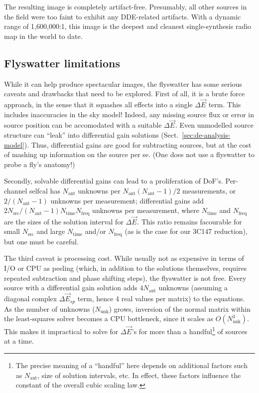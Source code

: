 \documentclass[]{aa}
\newcommand{\jones}[2]{\vec {#1}_{#2}}
\begin{document}
The resulting image is completely artifact-free. Presumably, all other sources in the field were too faint to exhibit any DDE-related artifacts. With a dynamic range of 1,600,000:1, this image is the deepest and cleanest single-synthesis radio map in the world to date. 

\subsection{Flyswatter limitations\label{sec:dE-limitations}}

While it can help produce spectacular images, the flyswatter has some serious caveats and drawbacks that need to be explored. First of all, it is a brute force approach, in the sense that it squashes all effects into a single $\Delta\jones{E}{}$ term. This includes inaccuracies in the sky model! Indeed, any missing source flux or error in source position can be accomodated with a suitable $\Delta\jones{E}{}$. Even unmodelled source structure can ``leak'' into differential gain solutions (Sect.~\ref{sec:de-analysis-model}). Thus, differential gains are good for subtracting sources, but at the cost of mashing up information on the source per se. (One does not use a flyswatter to probe a fly's anatomy!)

Secondly, solvable differential gains can lead to a proliferation of DoF's. Per-channel selfcal has $N_\mathrm{ant}$ unknowns per $N_\mathrm{ant}(N_\mathrm{ant}-1)/2$ measurements, or $2/(N_\mathrm{ant}-1)$ unknowns per measurement; differential gains add $2N_\mathrm{src}/(N_\mathrm{ant}-1)N_\mathrm{time}N_\mathrm{freq}$ unknowns per measurement, where $N_\mathrm{time}$ and $N_\mathrm{freq}$ are the sizes of the solution interval for $\Delta\jones{E}{}$. This ratio remains facourable for small $N_\mathrm{src}$ and large $N_\mathrm{time}$ and/or $N_\mathrm{freq}$ (as is the case for our 3C147 reduction), but one must be careful.

The third caveat is processing cost. While usually not as expensive in terms of I/O or CPU as peeling (which, in addition to the solutions themselves, requires repeated subtraction and phase shifting steps), the flyswatter is not free. Every source with a differential gain solution adds $4N_\mathrm{ant}$ unknowns (assuming a diagonal complex $\Delta\jones{E}{sp}$ term, hence 4 real values per matrix) to the equations. As the number of unknowns ($N_\mathrm{unk}$) grows, inversion of the normal matrix within the least-squares solver becomes a CPU bottleneck, since it scales as $O(N_\mathrm{unk}^3)$. This makes it impractical to solve for $\Delta\jones{E}{}$'s for more than a handful\footnote{The precise meaning of a ``handful'' here depends on additional factors such as $N_\mathrm{ant}$, size of solution intervals, etc. In effect, these factors influence the constant of the overall cubic scaling law.} of sources at a time. 
\end{document}

